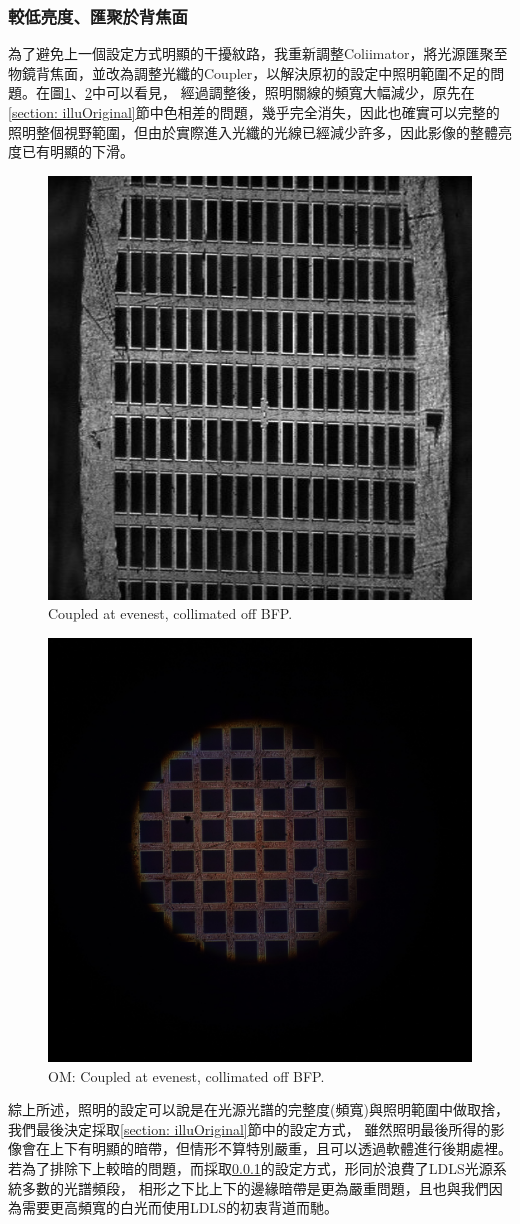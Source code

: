 \documentclass[12pt]{article}
\begin{document}
\subsubsection{較低亮度、匯聚於背焦面} \label{illuDark}
為了避免上一個設定方式明顯的干擾紋路，我重新調整Coliimator，將光源匯聚至物鏡背焦面，並改為調整光纖的Coupler，以解決原初的設定中照明範圍不足的問題。在圖\ref{figure: evenest_on}、\ref{figure: om_evenest_on}中可以看見，
經過調整後，照明關線的頻寬大幅減少，原先在\ref{section: illuOriginal}節中色相差的問題，幾乎完全消失，因此也確實可以完整的照明整個視野範圍，但由於實際進入光纖的光線已經減少許多，因此影像的整體亮度已有明顯的下滑。
\begin{figure}
    \centering
    \includegraphics[width=0.5\linewidth]{on_evenest.jpg}
    \caption{Coupled at evenest, collimated off BFP.}
    \label{figure: evenest_on}
\end{figure}
\begin{figure}
    \centering
    \includegraphics[width=0.5\linewidth]{om_on_evenest.JPG}
    \caption{OM: Coupled at evenest, collimated off BFP.}
    \label{figure: om_evenest_on}
\end{figure}

\noindent 綜上所述，照明的設定可以說是在光源光譜的完整度(頻寬)與照明範圍中做取捨，我們最後決定採取\ref{section: illuOriginal}節中的設定方式，
雖然照明最後所得的影像會在上下有明顯的暗帶，但情形不算特別嚴重，且可以透過軟體進行後期處裡。若為了排除下上較暗的問題，而採取\ref{illuDark}的設定方式，形同於浪費了LDLS光源系統多數的光譜頻段，
相形之下比上下的邊緣暗帶是更為嚴重問題，且也與我們因為需要更高頻寬的白光而使用LDLS的初衷背道而馳。
\end{document}
